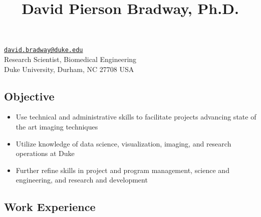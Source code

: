 \documentclass[
]{article}
\title{David Pierson Bradway, Ph.D.}
\author{}
\date{}
\providecommand{\tightlist}{%
  \setlength{\itemsep}{0pt}\setlength{\parskip}{0pt}}
\begin{document}
\maketitle

\href{mailto:david.bradway@duke.edu}{\nolinkurl{david.bradway@duke.edu}}\\
Research Scientist, Biomedical Engineering\\
Duke University, Durham, NC 27708 USA

\hypertarget{objective}{%
\subsection{Objective}\label{objective}}

\begin{itemize}
\tightlist
\item
  Use technical and administrative skills to facilitate projects
  advancing state of the art imaging techniques
\item
  Utilize knowledge of data science, visualization, imaging, and
  research operations at Duke
\item
  Further refine skills in project and program management, science and
  engineering, and research and development
\end{itemize}

\hypertarget{work-experience}{%
\subsection{Work Experience}\label{work-experience}}
\end{document}
